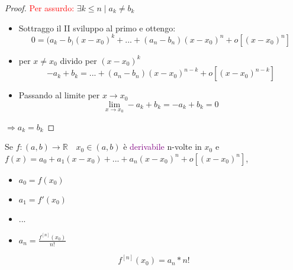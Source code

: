 \documentclass{article}
\begin{document}
\begin{proof}
    \textcolor{red}{Per assurdo: } $\exists k \le n \mid a_k \neq b_k $

    \begin{itemize}
        \item Sottraggo il II sviluppo al primo e ottengo: 
        \[0=(a_k-b_)(x -x_0)^k + ... + (a_n - b_n)(x - x_0)^n + o[(x-x_0)^n]\]
        \item per $x \neq x_0$ divido per $(x - x_0)^k$
        \[-a_k + b_k = ... + (a_n - b_n) (x - x_0)^{n-k} + o[(x-x_0)^{n-k}]\]
        \item Passando al limite per $x \to x_0$
        \[\lim_{x \to x_0} -a_k + b_k =-a_k + b_k = 0  \]
    \end{itemize}

    $\Rightarrow a_k = b_k$
    
\end{proof}

\begin{tcolorbox}[colback=white, colframe=purple]
    Se $f:(a,b) \to \mathbb{R} \quad x_0 \in (a,b)$ è \textcolor{purple}{derivabile} n-volte in $x_0$ e $f(x)=a_0 + a_1(x-x_0)+...+a_n(x-x_0)^n + o[(x-x_0)^n]$, 

    \begin{itemize}
        \item $a_0 = f(x_0)$
        \item $a_1= f'(x_0)$
        \item ...
        \item $a_n = \frac{f^{[n]}(x_0)}{n!}$
    \end{itemize}

    \[f^{[n]}(x_0) = a_n*n!\]
\end{tcolorbox}
\end{document}
